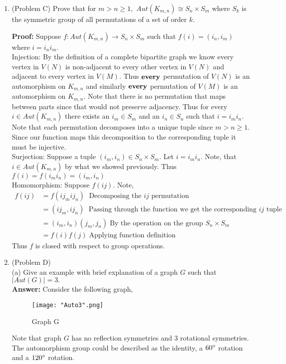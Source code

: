 \documentclass{amsart}
\begin{document}
\begin{enumerate}
\item (Problem C) Prove that for $m>n\geq 1,$ $Aut(K_{m,n}) \cong S_n \times S_m$ where $S_k$ is the symmetric group of all permutations of a set of order $k.$

\textbf{Proof:} Suppose $f: Aut(K_{m,n}) \to S_n \times S_m$ such that $f(i)=(i_n,i_m)$ where $i = i_ni_m$.\\

Injection: By the definition of a complete bipartite graph we know every vertex in $V(N)$ is non-adjacent to every other vertex in $V(N)$ and adjacent to every vertex in $V(M)$. Thus $\bold{every}$ permutation of $V(N)$ is an automorphism on $K_{m,n}$ and similarly $\bold{every}$ permutation of $V(M)$ is an automorphism on $K_{m,n}$. Note that there is no permutation that maps between parts since that would not preserve adjacency. Thus for every $i \in Aut(K_{m,n})$ there exists an $i_m \in S_m$ and an $i_n \in S_n$ such that $i = i_mi_n$. Note that each permutation decomposes into a unique tuple since $m>n\geq 1$. Since our function maps this decomposition to the corresponding tuple it must be injective. \\

Surjection: Suppose a tuple $(i_m,i_n) \in S_n \times S_m$. Let $i = i_mi_n$. Note, that $i \in Aut(K_{m,n})$ by what we showed previously. Thus $f(i) = f(i_mi_n)=(i_m,i_n)$\\

Homomorphism: Suppose $f(ij)$. Note,
\begin{align*}
f(ij)&=f(ij_mij_n) \text{$\;$ Decomposing the $ij$ permutation }\\
 &= (ij_m,ij_n) \text{$\;$ Passing through the function we get the corresponding $ij$ tuple}\\
 &= (i_m,i_n)(j_m,j_n) \text{$\;$By the operation on the group $S_n \times S_m$} \\
 &= f(i)f(j) \text{$\;$Applying function definition}
\end{align*}
Thus $f$ is closed with respect to group operations. 

\vspace{2in}
 

\item (Problem D) \\
(a) Give an example with brief explanation of a graph $G$ such that $|Aut(G)|=3.$ \\

\textbf{Answer:}
Consider the following graph,
\begin{figure}[H]
\caption{Graph G}
\centering
\texttt{[image: "Auto3".png]}
\end{figure}
Note that graph $G$ has no reflection symmetries and 3 rotational symmetries. The automorphism group could be described as the identity, a $60\degree$ rotation and a $120\degree$ rotation. 


\end{enumerate}
\end{document}
